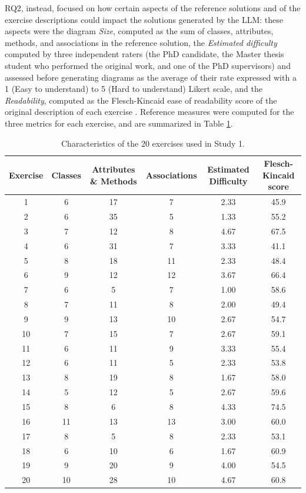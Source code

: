 RQ2, instead, focused on how certain aspects of the reference solutions and of the exercise descriptions could impact the solutions generated by the LLM: these aspects were the diagram \textit{Size}, computed as the sum of classes, attributes, methods, and associations in the reference solution, the \textit{Estimated difficulty} computed by three independent raters (the PhD candidate, the Master thesis student who performed the original work, and one of the PhD supervisors) and assessed before generating diagrams as the average of their rate expressed with a 1 (Easy to understand) to 5 (Hard to understand) Likert scale, and the \textit{Readability}, computed as the Flesch-Kincaid ease of readability score of the original description of each exercise \cite{solnyshkina2017flesch}. Reference measures were computed for the three metrics for each exercise, and are summarized in Table \ref{tab:ex_summary_llm4mod1}.


\begin{table}[ht]
\centering
\caption{Characteristics of the 20 exercises used in Study 1.}
\label{tab:ex_summary_llm4mod1}
\footnotesize
\begin{tabular}{cccccc}
\toprule
Exercise & Classes & Attributes \& Methods & Associations & Estimated Difficulty & Flesch-Kincaid score  \\
\midrule
1  & 6  & 17 & 7  & 2.33 & 45.9 \\
2  & 6  & 35 & 5  & 1.33 & 55.2 \\
3  & 7  & 12 & 8  & 4.67 & 67.5 \\
4  & 6  & 31 & 7  & 3.33 & 41.1 \\
5  & 8  & 18 & 11 & 2.33 & 48.4 \\
6  & 9  & 12 & 12 & 3.67 & 66.4 \\
7  & 6  & 5  & 7  & 1.00 & 58.6 \\
8  & 7  & 11 & 8  & 2.00 & 49.4 \\
9  & 9  & 13 & 10 & 2.67 & 54.7 \\
10 & 7  & 15 & 7  & 2.67 & 59.1 \\
11 & 6  & 11 & 9  & 3.33 & 55.4 \\
12 & 6  & 11 & 5  & 2.33 & 53.8 \\
13 & 8  & 19 & 8  & 1.67 & 58.0 \\
14 & 5  & 12 & 5  & 2.67 & 59.6 \\
15 & 8  & 6  & 8  & 4.33 & 74.5 \\
16 & 11 & 13 & 13 & 3.00 & 60.0 \\
17 & 8  & 5  & 8  & 2.33 & 53.1 \\
18 & 6  & 10 & 6  & 1.67 & 60.9 \\
19 & 9  & 20 & 9  & 4.00 & 54.5 \\
20 & 10 & 28 & 10 & 4.67 & 60.8 \\
\bottomrule
\end{tabular}
\end{table}


